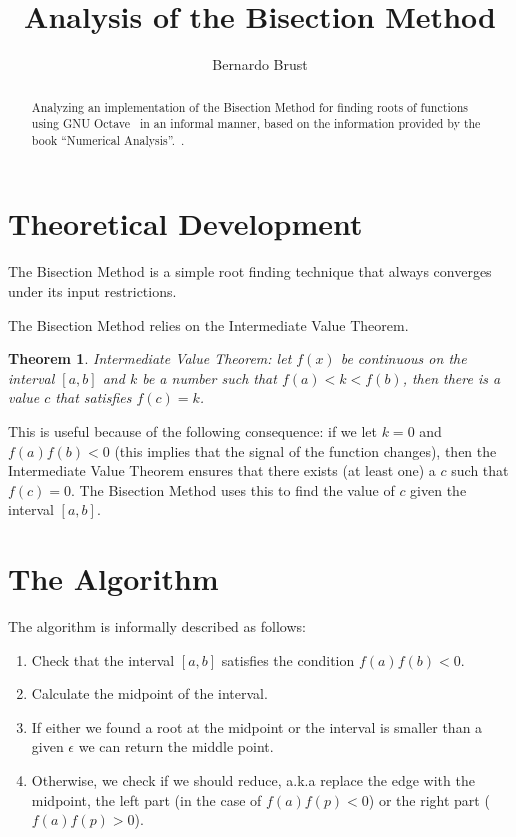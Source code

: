 \documentclass[12pt]{article}
\title{Analysis of the Bisection Method}
\author{Bernardo Brust}
\theoremstyle{plain}
\newtheorem*{theorem*}{Theorem}
\begin{document}
\maketitle

\begin{abstract}
  Analyzing an implementation of the Bisection Method for finding roots of functions using GNU Octave~\cite{octave} in an informal manner, based on the information provided by the book ``Numerical Analysis''.~\cite{book}.
\end{abstract}

\section{Theoretical Development}\label{sec:theory}

The Bisection Method is a simple root finding technique that always converges under its input restrictions.

The Bisection Method relies on the Intermediate Value Theorem.

\begin{theorem*}
  Intermediate Value Theorem: let $f(x)$ be continuous on the interval $[a, b]$ and $k$ be a number such that $f(a) < k < f(b)$, then there is a value $c$ that satisfies $f(c) = k$.
\end{theorem*}

This is useful because of the following consequence: if we let $k = 0$ and $f(a)f(b) < 0$ (this implies that the signal of the function changes), then the Intermediate Value Theorem ensures that there exists (at least one) a $c$ such that $f(c) = 0$. The Bisection Method uses this to find the value of $c$ given the interval $[a, b]$.

\section{The Algorithm}\label{sec:algorithm}

The algorithm is informally described as follows:
\begin{enumerate}\label{alg:bisection}
        \item Check that the interval $[a, b]$ satisfies the condition $f(a)f(b) < 0$.
        \item Calculate the midpoint of the interval.
        \item If either we found a root at the midpoint or the interval is smaller than a given $\epsilon$ we can return the middle point.
        \item Otherwise, we check if we should reduce, a.k.a replace the edge with the midpoint, the left part (in the case of $f(a)f(p) < 0$) or the right part ($f(a)f(p) > 0$).
\end{enumerate}
\end{document}
